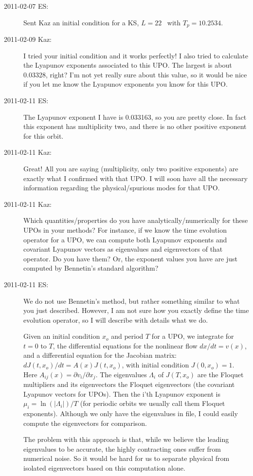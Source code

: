 \begin{description}
\item[2011-02-07 ES:] Sent Kaz an initial condition for a KS, $L=22$ \po\ with $T_p=10.2534$. 
\item[2011-02-09 Kaz:] I tried your initial condition and it works perfectly! 
I also tried to calculate the Lyapunov exponents associated to this UPO. 
The largest is about 0.03328, right? I'm not yet really sure about this value, 
so it would be nice if you let me know the Lyapunov exponents you know for this UPO.
\item[2011-02-11 ES:] The Lyapunov exponent I have is 0.033163, so you
are pretty close. In fact this exponent has multiplicity two, and
there is no other positive exponent for this orbit.
\item[2011-02-11 Kaz:] Great! All you are saying (multiplicity, only two positive 
exponents) are exactly what I confirmed with that UPO. I will soon have all 
the necessary information regarding the physical/spurious modes for that UPO.
\item[2011-02-11 Kaz:] Which quantities/properties do you have 
analytically/numerically for these UPOs in your methods? For instance, 
if we know the time evolution operator for a UPO, we can compute both 
Lyapunov exponents and covariant Lyapunov vectors as eigenvalues and 
eigenvectors of that operator. Do you have them? Or, the exponent values 
you have are just computed by Bennetin's standard algorithm?
\item[2011-02-11 ES:] We do not use Bennetin's method, but rather something similar to what
you just described. However, I am not sure how you exactly define the
time evolution operator, so I will describe with details what we do.

Given an initial condition $x_o$ and period $T$ for a UPO, we integrate
for $t=0$ to $T$, the differential equations for the nonlinear flow
$dx/dt=v(x)$, and a differential equation for the Jacobian matrix:
$dJ(t,x_o)/dt = A(x)J(t,x_o)$, with initial condition $J(0,x_o)=1$.
Here $A_{ij}(x)=\partial v_i/\partial x_j$. The eigenvalues $\Lambda_i$ of $J(T,x_o)$ are
the Floquet multipliers and its eigenvectors the Floquet eigenvectors
(the covariant Lyapunov vectors for UPOs). Then the i'th Lyapunov exponent is
$\mu_i = \ln(|\Lambda_i|)/ T$
(for periodic orbits we usually call them Floquet exponents).
Although we only have the eigenvalues in file, I could easily compute
the eigenvectors for comparison.

The problem with this approach is that, while we believe the leading
eigenvalues to be accurate, the highly contracting ones suffer from
numerical noise. So it would be hard for us to separate physical from
isolated eigenvectors based on this computation alone.


\end{description}
